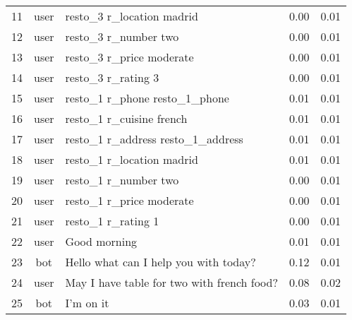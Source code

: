 \documentclass{article} \usepackage{iclr2018_conference,times}
\begin{document}
\begin{table}[h]
\begin{adjustbox}{max width=0.9\textwidth}
\begin{tabular}{|c|c|L{11cm}|C{1cm}|C{1cm}|}
11             & user              & resto\_3 r\_location madrid               & 0.00 & 0.01 \\
12             & user              & resto\_3 r\_number two                    & 0.00 & 0.01 \\
13             & user              & resto\_3 r\_price moderate                & 0.00 & 0.01 \\
14             & user              & resto\_3 r\_rating 3                      & 0.00 & 0.01 \\
15             & user              & resto\_1 r\_phone resto\_1\_phone         & 0.01 & 0.01 \\
16             & user              & resto\_1 r\_cuisine french                & 0.01 & 0.01 \\
17             & user              & resto\_1 r\_address resto\_1\_address     & 0.01 & 0.01 \\
18             & user              & resto\_1 r\_location madrid               & 0.01 & 0.01 \\
19             & user              & resto\_1 r\_number two                    & 0.00 & 0.01 \\
20             & user              & resto\_1 r\_price moderate                & 0.00 & 0.01 \\
21             & user              & resto\_1 r\_rating 1                      & 0.00 & 0.01 \\
22             & user              & Good morning                              & 0.01 & 0.01 \\
23             & bot               & Hello what can I help you with today?      & 0.12 & 0.01 \\
24             & user              & May I have table for two with french food? & 0.08 & 0.02 \\
25             & bot               & I'm on it                               & 0.03 & 0.01 \\

\end{tabular}
\end{adjustbox}
\end{table}
\end{document}
